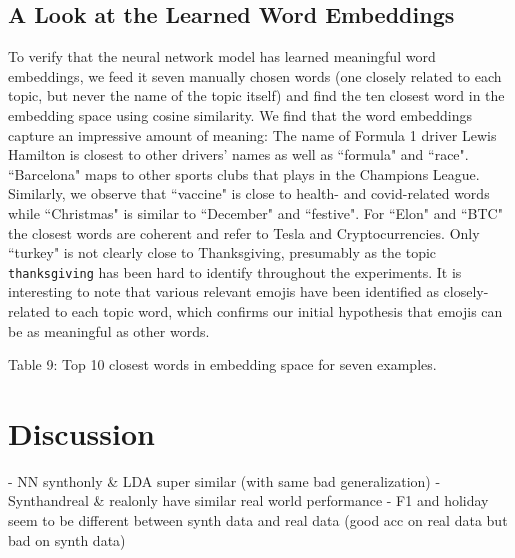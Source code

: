 \documentclass[11pt]{article}
\begin{document}
\subsection{A Look at the Learned Word Embeddings}
To verify that the neural network model has learned meaningful word embeddings, we feed it seven manually chosen words (one closely related to each topic, but never the name of the topic itself) and find the ten closest word in the embedding space using cosine similarity. We find that the word embeddings capture an impressive amount of meaning: The name of Formula 1 driver Lewis Hamilton is closest to other drivers' names as well as ``formula" and ``race". ``Barcelona" maps to other sports clubs that plays in the Champions League. Similarly,  we observe that ``vaccine" is close to health- and covid-related words while ``Christmas" is similar to ``December" and ``festive". For ``Elon" and ``BTC" the closest words are coherent and refer to Tesla and Cryptocurrencies. Only ``turkey" is not clearly close to Thanksgiving, presumably as the topic \texttt{thanksgiving} has been hard to identify throughout the experiments. It is interesting to note that various relevant emojis have been identified as closely-related to each topic word, which confirms our initial hypothesis that emojis can be as meaningful as other words.
\\[5pt]

\begin{adjustbox}{width=\columnwidth,center}

\end{adjustbox}
\begin{center}
	Table 9: Top 10 closest words in embedding space for seven examples.
\end{center}

\section{Discussion}
- NN synthonly \& LDA super similar (with same bad generalization)
- Synthandreal \& realonly have similar real world performance
- F1 and holiday seem to be different between synth data and real data (good acc on real data but bad on synth data)
\end{document}
